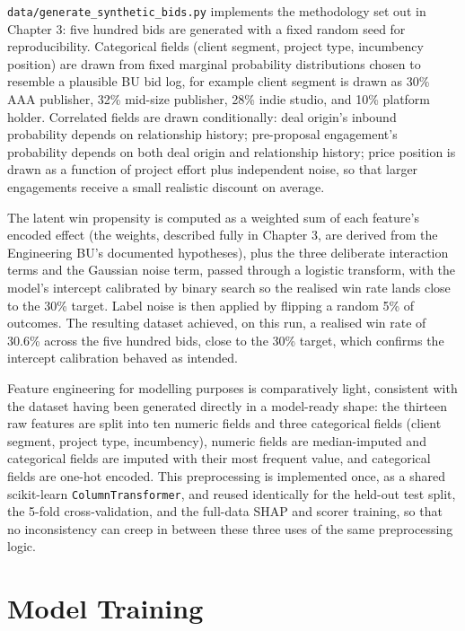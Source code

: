 \documentclass[12pt,oneside]{report}
\begin{document}
\texttt{data/generate\_synthetic\_bids.py} implements the methodology
set out in Chapter 3: five hundred bids are generated with a fixed
random seed for reproducibility. Categorical fields (client segment,
project type, incumbency position) are drawn from fixed marginal
probability distributions chosen to resemble a plausible BU bid log, for
example client segment is drawn as 30\% AAA publisher, 32\% mid-size
publisher, 28\% indie studio, and 10\% platform holder. Correlated
fields are drawn conditionally: deal origin's inbound probability
depends on relationship history; pre-proposal engagement's probability
depends on both deal origin and relationship history; price position is
drawn as a function of project effort plus independent noise, so that
larger engagements receive a small realistic discount on average.

The latent win propensity is computed as a weighted sum of each
feature's encoded effect (the weights, described fully in Chapter 3, are
derived from the Engineering BU's documented hypotheses), plus the three
deliberate interaction terms and the Gaussian noise term, passed through
a logistic transform, with the model's intercept calibrated by binary
search so the realised win rate lands close to the 30\% target. Label
noise is then applied by flipping a random 5\% of outcomes. The
resulting dataset achieved, on this run, a realised win rate of 30.6\%
across the five hundred bids, close to the 30\% target, which confirms
the intercept calibration behaved as intended.

Feature engineering for modelling purposes is comparatively light,
consistent with the dataset having been generated directly in a
model-ready shape: the thirteen raw features are split into ten numeric
fields and three categorical fields (client segment, project type,
incumbency), numeric fields are median-imputed and categorical fields
are imputed with their most frequent value, and categorical fields are
one-hot encoded. This preprocessing is implemented once, as a shared
scikit-learn \texttt{ColumnTransformer}, and reused identically for the
held-out test split, the 5-fold cross-validation, and the full-data SHAP
and scorer training, so that no inconsistency can creep in between these
three uses of the same preprocessing logic.

\hypertarget{model-training}{%
\section{Model Training}\label{model-training}}
\end{document}
